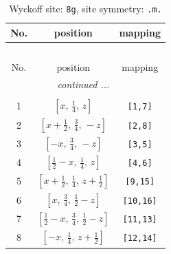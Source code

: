 \documentclass[fleqn,8pt]{jsarticle}
\begin{document}
\begin{longtable}{ccc}
\caption{Wyckoff site: {\tt 8g}, site symmetry: {\tt .m.}}
 \\
 \hline \hline
No. & position & mapping \\ \hline \endfirsthead

\multicolumn{2}{l}{\tablename\ \thetable{}} \\
 \hline \hline
No. & position & mapping \\ \hline \endhead

 \hline \hline
\multicolumn{2}{r}{\footnotesize\it continued ...} \\ \endfoot

 \hline \hline
\multicolumn{2}{r}{} \\ \endlastfoot

1 & $\left[ x,\, \frac{1}{4},\, z \right]$ & {\tt [1,7]} \\ \hline
2 & $\left[ x + \frac{1}{2},\, \frac{3}{4},\, - z \right]$ & {\tt [2,8]} \\ \hline
3 & $\left[ - x,\, \frac{3}{4},\, - z \right]$ & {\tt [3,5]} \\ \hline
4 & $\left[ \frac{1}{2} - x,\, \frac{1}{4},\, z \right]$ & {\tt [4,6]} \\ \hline
5 & $\left[ x + \frac{1}{2},\, \frac{1}{4},\, z + \frac{1}{2} \right]$ & {\tt [9,15]} \\ \hline
6 & $\left[ x,\, \frac{3}{4},\, \frac{1}{2} - z \right]$ & {\tt [10,16]} \\ \hline
7 & $\left[ \frac{1}{2} - x,\, \frac{3}{4},\, \frac{1}{2} - z \right]$ & {\tt [11,13]} \\ \hline
8 & $\left[ - x,\, \frac{1}{4},\, z + \frac{1}{2} \right]$ & {\tt [12,14]} \\
\end{longtable}
\renewcommand{\arraystretch}{1.2}
\end{document}
